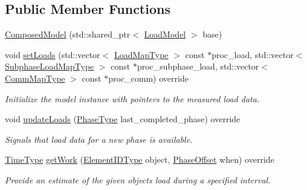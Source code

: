 \subsection*{Public Member Functions}
\begin{DoxyCompactItemize}
\item 
\hyperlink{classvt_1_1vrt_1_1collection_1_1balance_1_1_composed_model_a84b77c1fceb9e07a0706b896a4d9e9c9}{Composed\+Model} (std\+::shared\+\_\+ptr$<$ \hyperlink{classvt_1_1vrt_1_1collection_1_1balance_1_1_load_model}{Load\+Model} $>$ base)
\item 
void \hyperlink{classvt_1_1vrt_1_1collection_1_1balance_1_1_composed_model_af39d608580ad1512d11a45234c85e987}{set\+Loads} (std\+::vector$<$ \hyperlink{namespacevt_1_1vrt_1_1collection_1_1balance_a45306ee4bf38fe3fb586d1ee2fa3d147}{Load\+Map\+Type} $>$ const $\ast$proc\+\_\+load, std\+::vector$<$ \hyperlink{namespacevt_1_1vrt_1_1collection_1_1balance_a3d91523158c1025b7b665240072f3b7e}{Subphase\+Load\+Map\+Type} $>$ const $\ast$proc\+\_\+subphase\+\_\+load, std\+::vector$<$ \hyperlink{namespacevt_1_1vrt_1_1collection_1_1balance_a10860c956804d644db54a16012352728}{Comm\+Map\+Type} $>$ const $\ast$proc\+\_\+comm) override
\begin{DoxyCompactList}\small\item\em Initialize the model instance with pointers to the measured load data. \end{DoxyCompactList}\item 
void \hyperlink{classvt_1_1vrt_1_1collection_1_1balance_1_1_composed_model_ad8108b4392d63b7f09e443920a64933a}{update\+Loads} (\hyperlink{namespacevt_a46ce6733d5cdbd735d561b7b4029f6d7}{Phase\+Type} last\+\_\+completed\+\_\+phase) override
\begin{DoxyCompactList}\small\item\em Signals that load data for a new phase is available. \end{DoxyCompactList}\item 
\hyperlink{namespacevt_a876a9d0cd5a952859c72de8a46881442}{Time\+Type} \hyperlink{classvt_1_1vrt_1_1collection_1_1balance_1_1_composed_model_a5de9a43648cfd18ca00f1f0a6c61be4d}{get\+Work} (\hyperlink{namespacevt_1_1vrt_1_1collection_1_1balance_a14c8d2c972f2913aa3f1636e5be0a120}{Element\+I\+D\+Type} object, \hyperlink{structvt_1_1vrt_1_1collection_1_1balance_1_1_phase_offset}{Phase\+Offset} when) override
\begin{DoxyCompactList}\small\item\em Provide an estimate of the given object\textquotesingle{}s load during a specified interval. \end{DoxyCompactList}\item 

\end{DoxyCompactItemize}
